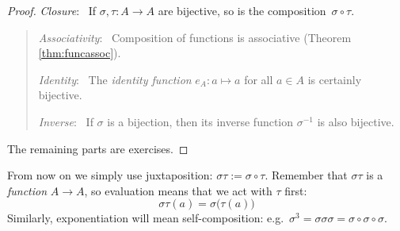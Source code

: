 \begin{proof}
\exstart \emph{Closure}: \ If $\sigma,\tau:A\to A$ are bijective, so is the composition\footnotemark\ $\sigma\circ\tau$.\vspace{-5pt}
  \begin{quote}
		\emph{Associativity}: \ Composition of functions is associative (Theorem \ref{thm:funcassoc}).\par
		\emph{Identity}: \ The \emph{identity function} $e_A:a\mapsto a$ for all $a\in A$ is certainly bijective.\par
		\emph{Inverse}: \ If $\sigma$ is a bijection, then its inverse function $\sigma^{-1}$ is also bijective.
	\end{quote}
	
		The remaining parts are exercises.
\end{proof}


From now on we simply use juxtaposition: $\sigma\tau:=\sigma\circ\tau$. Remember that $\sigma\tau$ is a \emph{function} $A\to A$, so evaluation means that we act with $\tau$ first:
\[\sigma\tau(a)=\sigma\bigl(\tau(a)\bigr)\]
Similarly, exponentiation will mean self-composition: e.g.\ $\sigma^3=\sigma\sigma\sigma=\sigma\circ\sigma\circ\sigma$.


